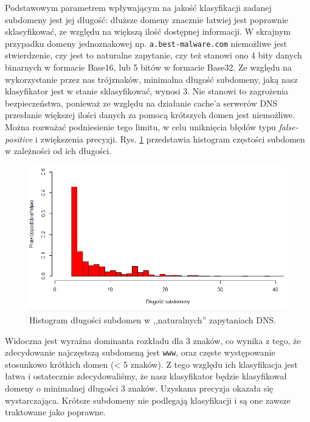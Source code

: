 \documentclass{eiti-raport}
\begin{document}
Podstawowym parametrem wpływającym na jakość klasyfikacji zadanej subdomeny jest jej długość: dłuższe domeny znacznie łatwiej jest poprawnie sklasyfikować, ze względu na większą ilość dostępnej informacji. W skrajnym przypadku domeny jednoznakowej np. \texttt{a.best-malware.com} niemożliwe jest stwierdzenie, czy jest to naturalne zapytanie, czy też stanowi ono 4 bity danych binarnych w formacie Base16, lub 5 bitów w formacie Base32. Ze względu na wykorzystanie przez nas trójznaków, minimalna długość subdomeny, jaką nasz klasyfikator jest w stanie sklasyfikować, wynosi 3. Nie stanowi to zagrożenia bezpieczeństwa, ponieważ ze względu na działanie cache'a serwerów DNS przesłanie większej ilości danych za pomocą krótszych domen jest niemożliwe. Można rozważać podniesienie tego limitu, w celu uniknięcia błędów typu \emph{false-positive} i zwiększenia precyzji. Rys. \ref{fig:length-hist} przedstawia histogram częstości subdomen w zależności od ich długości. 
\begin{figure}[!h] \centering
	\includegraphics[width=0.9\linewidth]{img/length-hist.PNG}
	\caption{Histogram długości subdomen w ,,naturalnych'' zapytaniach DNS.} \label{fig:length-hist}
\end{figure}
Widoczna jest wyraźna dominanta rozkładu dla 3 znaków, co wynika z tego, że zdecydowanie najczęstszą subdomeną jest \texttt{www}, oraz częste występowanie stosunkowo krótkich domen (< 5 znaków). Z tego względu ich klasyfikacja jest łatwa i ostatecznie zdecydowaliśmy, że nasz klasyfikator będzie klasyfikował domeny o minimalnej długości 3 znaków. Uzyskana precyzja okazała się wystarczająca. Krótsze subdomeny nie podlegają klasyfikacji i są one zawsze traktowane jako poprawne. 
\end{document}
